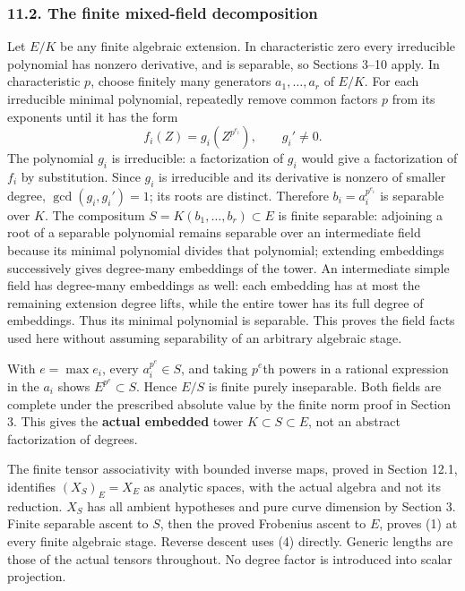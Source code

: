 \documentclass[
  11pt,
]{article}
\begin{document}
\subsubsection{11.2. The finite mixed-field
decomposition}\label{the-finite-mixed-field-decomposition}

Let \(E/K\) be any finite algebraic extension. In characteristic zero
every irreducible polynomial has nonzero derivative, and is separable,
so Sections 3--10 apply. In characteristic \(p\), choose finitely many
generators \(a_1,\ldots,a_r\) of \(E/K\). For each irreducible minimal
polynomial, repeatedly remove common factors \(p\) from its exponents
until it has the form \[
                f_i(Z)=g_i(Z^{p^{e_i}}),\qquad g_i'\ne0.
                                                               \tag{29}
\] The polynomial \(g_i\) is irreducible: a factorization of \(g_i\)
would give a factorization of \(f_i\) by substitution. Since \(g_i\) is
irreducible and its derivative is nonzero of smaller degree,
\(\gcd(g_i,g_i')=1\); its roots are distinct. Therefore
\(b_i=a_i^{p^{e_i}}\) is separable over \(K\). The compositum
\(S=K(b_1,\ldots,b_r)\subset E\) is finite separable: adjoining a root
of a separable polynomial remains separable over an intermediate field
because its minimal polynomial divides that polynomial; extending
embeddings successively gives degree-many embeddings of the tower. An
intermediate simple field has degree-many embeddings as well: each
embedding has at most the remaining extension degree lifts, while the
entire tower has its full degree of embeddings. Thus its minimal
polynomial is separable. This proves the field facts used here without
assuming separability of an arbitrary algebraic stage.

With \(e=\max e_i\), every \(a_i^{p^e}\in S\), and taking \(p^e\)th
powers in a rational expression in the \(a_i\) shows
\(E^{p^e}\subset S\). Hence \(E/S\) is finite purely inseparable. Both
fields are complete under the prescribed absolute value by the finite
norm proof in Section 3. This gives the \textbf{actual embedded} tower
\(K\subset S\subset E\), not an abstract factorization of degrees.

The finite tensor associativity with bounded inverse maps, proved in
Section 12.1, identifies \((X_S)_E=X_E\) as analytic spaces, with the
actual algebra and not its reduction. \(X_S\) has all ambient hypotheses
and pure curve dimension by Section 3. Finite separable ascent to \(S\),
then the proved Frobenius ascent to \(E\), proves (1) at every finite
algebraic stage. Reverse descent uses (4) directly. Generic lengths are
those of the actual tensors throughout. No degree factor is introduced
into scalar projection.
\end{document}
